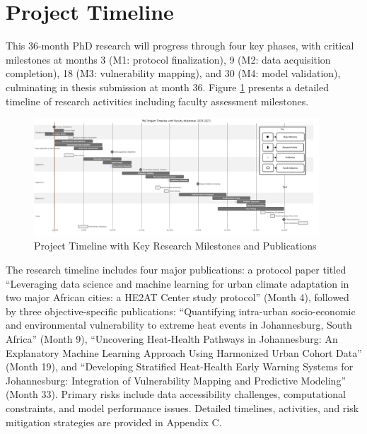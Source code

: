 \section{Project Timeline}
This 36-month PhD research will progress through four key phases, with critical milestones at months 3 (M1: protocol finalization), 9 (M2: data acquisition completion), 18 (M3: vulnerability mapping), and 30 (M4: model validation), culminating in thesis submission at month 36. Figure \ref{fig:gantt} presents a detailed timeline of research activities including faculty assessment milestones.
\begin{figure}[h]
\centering
\includegraphics[width=0.95\textwidth]{sections/images/GANTT.png}
\caption{Project Timeline with Key Research Milestones and Publications}
\label{fig:gantt}
\end{figure}
The research timeline includes four major publications: a protocol paper titled ``Leveraging data science and machine learning for urban climate adaptation in two major African cities: a HE2AT Center study protocol'' \cite{Jack} (Month 4), followed by three objective-specific publications: ``Quantifying intra-urban socio-economic and environmental vulnerability to extreme heat events in Johannesburg, South Africa'' (Month 9), ``Uncovering Heat-Health Pathways in Johannesburg: An Explanatory Machine Learning Approach Using Harmonized Urban Cohort Data'' (Month 19), and ``Developing Stratified Heat-Health Early Warning Systems for Johannesburg: Integration of Vulnerability Mapping and Predictive Modeling'' (Month 33).
Primary risks include data accessibility challenges, computational constraints, and model performance issues. Detailed timelines, activities, and risk mitigation strategies are provided in Appendix C.